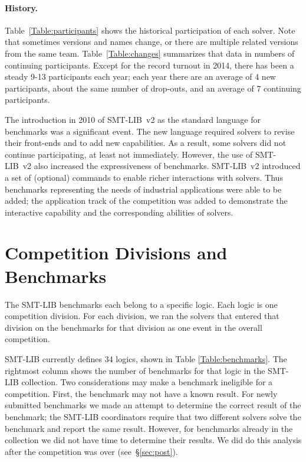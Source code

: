 \documentclass[twoside,11pt]{article}
\begin{document}
\paragraph{History.} Table~\ref{Table:participants} shows the
 historical participation of each solver. Note that sometimes versions and names change, or there are multiple related versions from the same team. 
Table~\ref{Table:changes} summarizes that data in numbers of continuing participants. Except for the record turnout in
 2014, there has been a steady 9-13 participants each year; each year there are an average of 4 new
 participants, about the same number of drop-outs, and an average of 7 continuing participants. 

The introduction in 2010 of SMT-LIB~v2 as the standard language for benchmarks was a significant event. The new language required solvers to revise their front-ends and to add new capabilities.
As a result, some solvers did not continue participating, at least not immediately. However, the use of SMT-LIB~v2 also increased the expressiveness of benchmarks. SMT-LIB~v2 introduced a set of (optional) commands to enable richer interactions with solvers. Thus benchmarks representing the needs of industrial applications were able to be added; 
the application track of the competition was added to demonstrate the interactive capability and the corresponding abilities of solvers.

\section{Competition Divisions and Benchmarks}
\label{sec:benchmarks}

The SMT-LIB benchmarks each belong to a specific logic. Each logic is one competition division. For each division, we ran the solvers that entered that division on the benchmarks for that division as one event in the overall competition.

SMT-LIB currently defines 34 logics, shown in Table \ref{Table:benchmarks}. The rightmost column shows the number of benchmarks for that logic in the SMT-LIB collection. Two considerations may make a benchmark ineligible for a competition. First, the benchmark may not have a known result. For newly submitted benchmarks
we made an attempt to determine the correct result of the benchmark; the SMT-LIB coordinators require that two 
different solvers solve the benchmark and report the same result. However, for benchmarks already in the collection we did not have time to determine their results. We did do this analysis after the competition was over (see~\S\ref{sec:post}).
\end{document}
